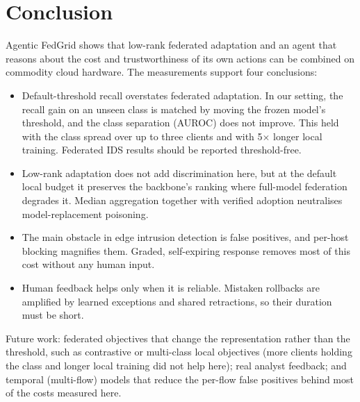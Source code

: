\section{Conclusion}
Agentic FedGrid shows that low-rank federated adaptation and an agent that
reasons about the cost and trustworthiness of its own actions can be combined
on commodity cloud hardware. The measurements support four conclusions:
\begin{itemize}
\item Default-threshold recall overstates federated adaptation. In our
setting, the recall gain on an unseen class is matched by moving the frozen
model's threshold, and the class separation (AUROC) does not improve. This
held with the class spread over up to three clients and with 5$\times$ longer
local training. Federated IDS results should be reported threshold-free.
\item Low-rank adaptation does not add discrimination here, but at the default
local budget it preserves the backbone's ranking where full-model federation
degrades it. Median
aggregation together with verified adoption neutralises model-replacement
poisoning.
\item The main obstacle in edge intrusion detection is false positives, and
per-host blocking magnifies them. Graded, self-expiring response removes most
of this cost without any human input.
\item Human feedback helps only when it is reliable. Mistaken rollbacks are
amplified by learned exceptions and shared retractions, so their duration
must be short.
\end{itemize}
Future work: federated objectives that change the representation rather than
the threshold, such as contrastive or multi-class local objectives (more
clients holding the class and longer local training did not help here); real
analyst feedback; and temporal (multi-flow)
models that reduce the per-flow false positives behind most of the costs
measured here.
